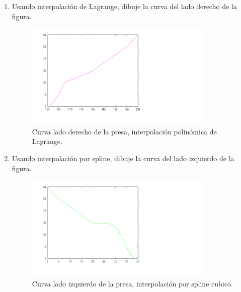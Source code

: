 \documentclass{udpreport}
\begin{document}
\begin{enumerate}
\begin{enumerate}
 \item Usando interpolación de Lagrange, dibuje la curva del lado derecho de la  figura.
 
  \begin{figure}[H]
    \centering
    \includegraphics[width=9cm]{curva_derecha_lagrange}
    \caption{Curva lado derecho de la presa, interpolación polinómica de Lagrange.} \label{fig:curva_derecha_lagrange}
  
\end{figure}
 \item Usando interpolación por spline, dibuje la curva del lado izquierdo de la  figura.
 \\
 \begin{figure}[H]
    \centering
    \includegraphics[width=9cm]{curvaizq_spline}
    \caption{Curva lado izquierdo de la presa, interpolación por spline cubico.} \label{fig:curvaizq_spline}
\end{figure}
 \end{enumerate}
 \end{enumerate}
 \newpage

    
    
\end{document}
